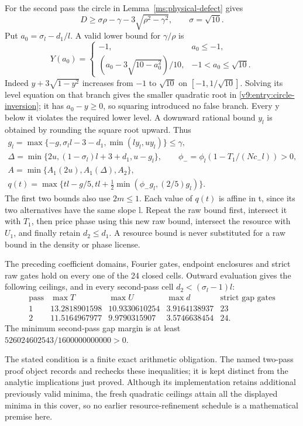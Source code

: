 For the second pass the circle in Lemma~\ref{ms:physical-defect} gives
\[
 D\ge\sigma\rho-\gamma-3\sqrt{\rho^2-\gamma^2},\qquad\sigma=\sqrt{10}.
\]
Put $a_0=\sigma_l-d_1/l$. A valid lower bound for $\gamma/\rho$ is
\begin{equation}\label{v9:entry:circle-inversion}
 Y(a_0)=\begin{cases}-1,&a_0\le-1,\\
 (a_0-3\sqrt{10-a_0^2})/10,&-1<a_0\le\sqrt{10}.
 \end{cases}
\end{equation}
Indeed $y+3\sqrt{1-y^2}$ increases from $-1$ to $\sqrt{10}$ on
$[-1,1/\sqrt{10}]$. Solving its level equation on that branch gives
the smaller quadratic root in \eqref{v9:entry:circle-inversion};
it has $a_0-y\ge0$, so squaring introduced no false branch. Every y
below it violates the required lower level. A downward rational bound
$y_l$ is obtained by rounding the square root upward. Thus
\begin{gather*}
 g_l=\max\{-g,\sigma_l l-3-d_1,\min(ly_l,uy_l)\}\le\gamma,\\
 \Delta=\min\{2u,(1-\sigma_l)l+3+d_1,u-g_l\},\qquad
 \phi_- =\phi_l(1-T_1/(Nc_-l))>0,\\
 A=\min\{A_1(2u),A_1(\Delta),A_2\},\\
 q(t)=\max\{tl-g/5,tl+\tfrac12\min(\phi_-g_l,(2/5)g_l)\}.
\end{gather*}
The first two bounds also use $2m\le1$. Each value of $q(t)$ is affine
in t, since its two alternatives have the same slope l. Repeat the
raw bound first, intersect it with $T_1$, then price phase using this
new raw bound, intersect the resource with $U_1$, and finally retain
$d_2\le d_1$. A resource bound is never substituted for a raw bound
in the density or phase license.

\begin{condition}\label{v9:entry:two-pass-condition}
The preceding coefficient domains, Fourier gates, endpoint enclosures
and strict raw gates hold on every one of the 24 closed cells. Outward
evaluation gives the following ceilings, and in every second-pass cell
$d_2<(\sigma_l-1)l$:
\[
\begin{array}{c|r|r|r|c}
 \text{pass}&\max T&\max U&\max d&\text{strict gap gates}\\\hline
 1&13.2818901598&10.9330610254&3.9164138937&23\\
 2&11.5164967977&9.9790315907&3.5746638454&24.
\end{array}
\]
The minimum second-pass gap margin is at least
$526024602543/1600000000000>0$.
\end{condition}
The stated condition is a finite exact arithmetic obligation. The named
two-pass proof object records and rechecks these inequalities; it is
kept distinct from the analytic implications just proved. Although its
implementation retains additional previously valid minima, the fresh
quadratic ceilings attain all the displayed minima in this cover, so
no earlier resource-refinement schedule is a mathematical premise here.

